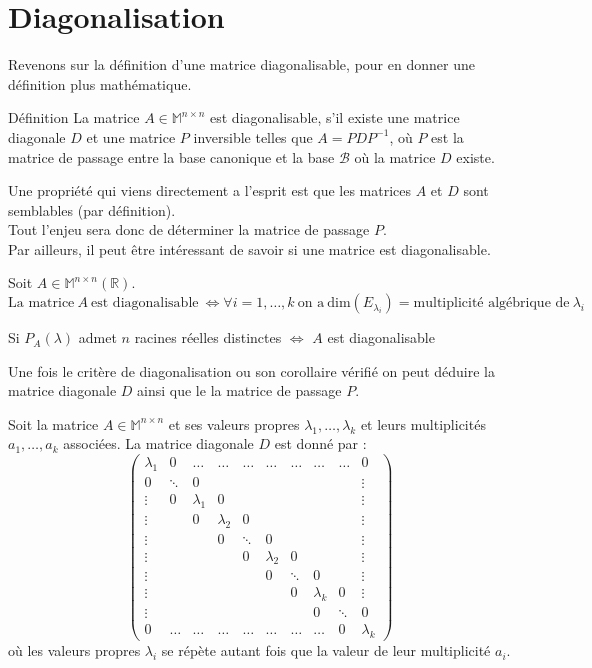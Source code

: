 \section{Diagonalisation}
Revenons sur la définition d'une matrice diagonalisable, pour en donner une définition plus mathématique.
\begin{bclogo}[couleur=blue!30,couleurBord=blue,arrondi=0.1,logo=\bcbook,ombre=true]{Définition}
La matrice $A\in\mathbb{M}^{n\times n}$ est diagonalisable, s'il existe une matrice diagonale $D$ et une matrice $P$ inversible telles que $A=PDP^{-1}$, où $P$ est la matrice de passage entre la base canonique et la base $\mathscr{B}$ où la matrice $D$ existe.
\end{bclogo}
Une propriété qui viens directement a l'esprit est que les matrices $A$ et $D$ sont semblables (par définition).\\
Tout l'enjeu sera donc de déterminer la matrice de passage $P$.\\
Par ailleurs, il peut être intéressant de savoir si une matrice est diagonalisable. 
\begin{thm}
Soit $A\in\mathbb{M}^{n\times n}(\mathbb{R})$.
$\text{La matrice}\ A\ \text{est diagonalisable}\ \Leftrightarrow\forall i=1,\hdots,k\ \text{on a}\ \text{dim}(E_{\lambda_i})=\text{multiplicité algébrique de}\ \lambda_i$
\end{thm}
\begin{thm}[Corollaire]
Si $P_A(\lambda)$ admet $n$ racines réelles distinctes $\Leftrightarrow$ $A$ est diagonalisable
\end{thm}
Une fois le critère de diagonalisation ou son corollaire vérifié on peut déduire la matrice diagonale $D$ ainsi que le la matrice de passage $P$.
\begin{prop}
Soit la matrice $A\in\mathbb{M}^{n\times n}$ et ses valeurs propres $\lambda_1,\hdots, \lambda_k$ et leurs multiplicités $a_1,\hdots,a_k$ associées.
La matrice diagonale $D$ est donné par :\\
$$\begin{pmatrix}
\lambda_1 & 0 & \hdots & \hdots & \hdots & \hdots & \hdots & \hdots & \hdots & 0\\
0 & \ddots & 0 & & & & & & & \vdots\\
\vdots & 0 & \lambda_1 & 0 & & & & & & \vdots\\
\vdots & & 0 & \lambda_2 & 0 & & & & & \vdots \\
\vdots & & & 0 & \ddots & 0 & & & & \vdots\\
\vdots & & & & 0 & \lambda_2 & 0 & & & \vdots\\
\vdots & & & & & 0 & \ddots & 0 & & \vdots\\
\vdots & & & & & & 0 & \lambda_k & 0 & \vdots\\
\vdots & & & & & & & 0 & \ddots & 0 \\
0 & \hdots & \hdots & \hdots & \hdots & \hdots & \hdots & \hdots & 0 & \lambda_k
\end{pmatrix}$$
où les valeurs propres $\lambda_i$ se répète autant fois que la valeur de leur multiplicité $a_i$.
\end{prop}
